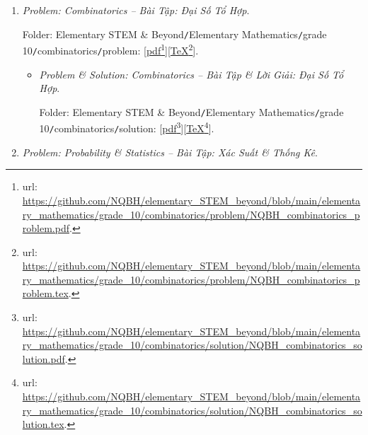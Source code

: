 \documentclass[12pt]{article}
\begin{document}
\begin{enumerate}
\begin{itemize}
		Folder: {\sf Elementary STEM \& Beyond{\tt/}Elementary Mathematics{\tt/}grade 10{\tt/}vector{\tt/}solution}: [\href{https://github.com/NQBH/elementary_STEM_beyond/blob/main/elementary_mathematics/grade_10/vector/solution/NQBH_vector_solution.pdf}{pdf}\footnote{{\sc url}: \url{https://github.com/NQBH/elementary_STEM_beyond/blob/main/elementary_mathematics/grade_10/vector/solution/NQBH_vector_solution.pdf}.}][\href{https://github.com/NQBH/elementary_STEM_beyond/blob/main/elementary_mathematics/grade_10/vector/solution/NQBH_vector_solution.tex}{\TeX}\footnote{{\sc url}: \url{https://github.com/NQBH/elementary_STEM_beyond/blob/main/elementary_mathematics/grade_10/vector/solution/NQBH_vector_solution.tex}.}].
	\end{itemize}
	\item {\it Problem: Combinatorics -- Bài Tập: Đại Số Tổ Hợp}.
	
	Folder: {\sf Elementary STEM \& Beyond{\tt/}Elementary Mathematics{\tt/}grade 10{\tt/}combinatorics{\tt/}problem}: [\href{https://github.com/NQBH/elementary_STEM_beyond/blob/main/elementary_mathematics/grade_10/combinatorics/problem/NQBH_combinatorics_problem.pdf}{pdf}\footnote{{\sc url}: \url{https://github.com/NQBH/elementary_STEM_beyond/blob/main/elementary_mathematics/grade_10/combinatorics/problem/NQBH_combinatorics_problem.pdf}.}][\href{https://github.com/NQBH/elementary_STEM_beyond/blob/main/elementary_mathematics/grade_10/combinatorics/problem/NQBH_combinatorics_problem.tex}{\TeX}\footnote{{\sc url}: \url{https://github.com/NQBH/elementary_STEM_beyond/blob/main/elementary_mathematics/grade_10/combinatorics/problem/NQBH_combinatorics_problem.tex}.}].
	\begin{itemize}
		\item {\it Problem \& Solution: Combinatorics -- Bài Tập \& Lời Giải: Đại Số Tổ Hợp}.
		
		Folder: {\sf Elementary STEM \& Beyond{\tt/}Elementary Mathematics{\tt/}grade 10{\tt/}combinatorics{\tt/}solution}: [\href{https://github.com/NQBH/elementary_STEM_beyond/blob/main/elementary_mathematics/grade_10/combinatorics/solution/NQBH_combinatorics_solution.pdf}{pdf}\footnote{{\sc url}: \url{https://github.com/NQBH/elementary_STEM_beyond/blob/main/elementary_mathematics/grade_10/combinatorics/solution/NQBH_combinatorics_solution.pdf}.}][\href{https://github.com/NQBH/elementary_STEM_beyond/blob/main/elementary_mathematics/grade_10/combinatorics/solution/NQBH_combinatorics_solution.tex}{\TeX}\footnote{{\sc url}: \url{https://github.com/NQBH/elementary_STEM_beyond/blob/main/elementary_mathematics/grade_10/combinatorics/solution/NQBH_combinatorics_solution.tex}.}].
	\end{itemize}
	\item {\it Problem: Probability \& Statistics -- Bài Tập: Xác Suất \& Thống Kê}.
	

\end{enumerate}
\end{document}
